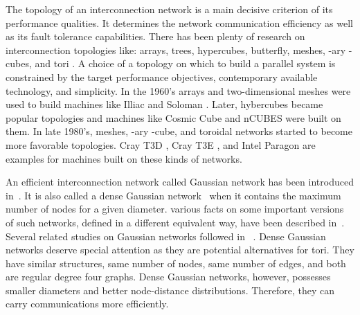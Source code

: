 \documentclass[12pt,journal,compsoc,onecolumn,]{IEEEtran}
\begin{document}
The topology of an interconnection network is a main decisive criterion of its
performance qualities. It determines the network communication efficiency as
well as its fault tolerance capabilities. There has been plenty of research on
interconnection topologies like: arrays, trees, hypercubes, butterfly, meshes,
-ary -cubes, and tori \cite{bose1995lee} \cite{dally2004principles}
\cite{leighton2014introduction}. A choice of a topology on which to build a
parallel system is constrained by the target performance objectives,
contemporary available technology, and simplicity. In the 1960's arrays and
two-dimensional meshes were used to build machines like Illiac
\cite{barnes1968illiac} and Soloman \cite{Slotnick:1962:SC:1461518.1461528}.
Later, hybercubes became popular topologies and machines like Cosmic Cube
\cite{seitz1985cosmic} and nCUBES \cite{Ncube:1988:NFH:62297.62415} were built
on them. In late 1980's, meshes, -ary -cube, and toroidal networks
started to become more favorable topologies. Cray T3D \cite{cray1993}, Cray
T3E \cite{scott1996cray}, and Intel Paragon \cite{esser1993intel} are examples
for machines built on these kinds of networks.

An efficient interconnection network called Gaussian network has been
introduced in~\cite{10.1109/TC.2008.57}. It is also called a dense Gaussian network~\cite{martinez2006dense}
when it contains the maximum number of nodes for a given diameter. various facts on some important
versions of such networks, defined in a different equivalent way, have been
described in~\cite{martinez2006dense}. Several related studies on Gaussian
networks followed in~\cite{Flahive:2010:TGE:1850268.1850301}
\cite{Shamaei:2014:HDG:2672598.2673055} \cite{touzene2015all}
\cite{zhang2013efficient}.
Dense Gaussian networks deserve special attention as they are potential alternatives
for  tori.
They have similar structures, same number of nodes, same
number of edges, and both are regular degree four graphs.
Dense Gaussian networks, however,
possesses smaller diameters and better node-distance distributions.
Therefore, they can carry communications more efficiently.
\end{document}
